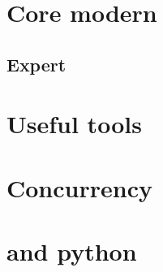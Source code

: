 \documentclass[compress]{beamer}
\begin{document}
\section[More]{Core modern \cpp}

\begin{advanced}
  
\end{advanced}


\begin{advanced}
  
  
\end{advanced}



\begin{advanced}
  
  
  
\end{advanced}

\begin{advanced}
  
\end{advanced}

\begin{advanced}
  \section[exp]{Expert \cpp}
  
  
  
  
  
  
  
\end{advanced}

\section[Tool]{Useful tools}






\begin{advanced}
  
  
  
  
  

  \section[conc]{Concurrency}
  
  
  
  

  \section[py]{\cpp and python}
  
  
  
  
\end{advanced}
\end{document}
